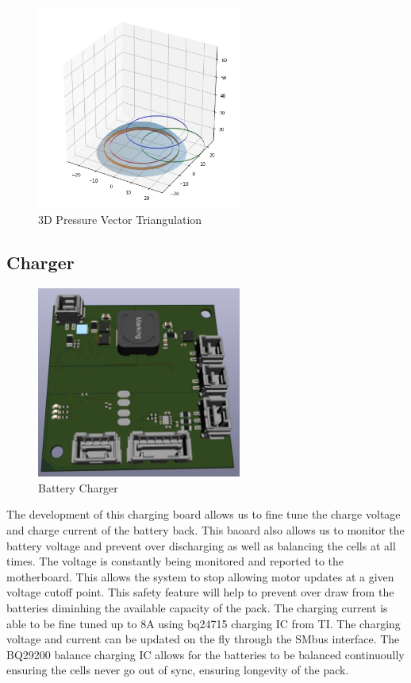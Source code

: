 \begin{figure}[H]
    \centering
    \includegraphics[width=0.6\textwidth]{figures/Footsensordome.png}
    \caption{3D Pressure Vector Triangulation}
    \label{fig:3DPressureVectorTriangulation}
\end{figure}

\subsection{Charger}
\begin{figure}[H]
       \centering
       \includegraphics[width=0.6\textwidth]{figures/Charger.png}
       \caption{Battery Charger}
       \label{fig:ChargerPCB}
   \end{figure}
The development of this charging board allows us to fine tune the charge voltage and charge current of the battery back. This baoard also allows us to monitor the battery voltage and prevent over discharging as well as balancing the cells at all times. The voltage is constantly being monitored and reported to the motherboard. This allows the system to stop allowing motor updates at a given voltage cutoff point. This safety feature will help to prevent over draw from the batteries diminhing the available capacity of the pack. The charging current is able to be fine tuned up to 8A using bq24715 charging IC from TI. The charging voltage and current can be updated on the fly through the SMbus interface. The BQ29200 balance charging IC allows for the batteries to be balanced continuoully ensuring the cells never go out of sync, ensuring longevity of the pack.

